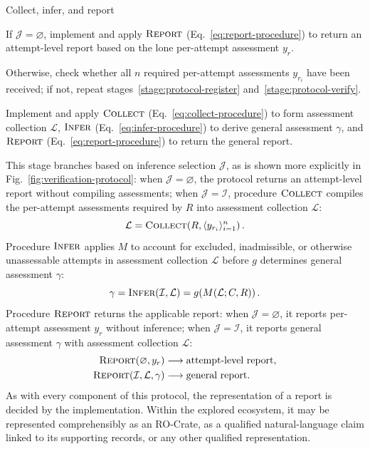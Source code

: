 \documentclass[conference,a4paper]{IEEEtran}
\begin{document}
  \begin{protocolstage}{Collect, infer, and report}
    \label{stage:protocol-report}
    \item\label{step:protocol-inference-bound}
      If $\mathcal J=\varnothing$, implement and apply $\operatorname{\textsc{Report}}$ (Eq.~\eqref{eq:report-procedure}) to return an attempt-level report based on the lone per-attempt assessment $y_r$.
    \item\label{step:protocol-attempts-collected}
      Otherwise, check whether all $n$ required per-attempt assessments $y_{r_i}$ have been received; if not, repeat stages~\ref{stage:protocol-register} and~\ref{stage:protocol-verify}.
    \item\label{step:protocol-infer-report}
      Implement and apply $\operatorname{\textsc{Collect}}$ (Eq.~\eqref{eq:collect-procedure}) to form assessment collection $\mathcal L$, $\operatorname{\textsc{Infer}}$ (Eq.~\eqref{eq:infer-procedure}) to derive general assessment $\gamma$, and $\operatorname{\textsc{Report}}$ (Eq.~\eqref{eq:report-procedure}) to return the general report.
  \end{protocolstage}
  This stage branches based on inference selection $\mathcal J$, as is shown more explicitly in Fig.~\ref{fig:verification-protocol}: when $\mathcal J=\varnothing$, the protocol returns an attempt-level report without compiling assessments; when $\mathcal J=\mathcal I$, procedure $\operatorname{\textsc{Collect}}$ compiles the per-attempt assessments required by $R$ into assessment collection $\mathcal L$:
  \begin{equation}
    \mathcal L
      =\operatorname{\textsc{Collect}}\!\left(R,\langle y_{r_i}\rangle_{i=1}^{n}\right).
    \label{eq:collect-procedure}
  \end{equation}
  Procedure $\operatorname{\textsc{Infer}}$ applies $M$ to account for excluded, inadmissible, or otherwise unassessable attempts in assessment collection $\mathcal L$ before $g$ determines general assessment $\gamma$:
  \begin{equation}
    \gamma
      =\operatorname{\textsc{Infer}}(\mathcal I,\mathcal L)
       =g\!\left(M(\mathcal L;C,R)\right).
    \label{eq:infer-procedure}
  \end{equation}
  Procedure $\operatorname{\textsc{Report}}$ returns the applicable report: when $\mathcal J=\varnothing$, it reports per-attempt assessment $y_r$ without inference; when $\mathcal J=\mathcal I$, it reports general assessment $\gamma$ with assessment collection $\mathcal L$:
  \begin{equation}
    \begin{aligned}
      \operatorname{\textsc{Report}}(\varnothing,y_r)
        &\longrightarrow \text{attempt-level report},\\
      \operatorname{\textsc{Report}}(\mathcal I,\mathcal L,\gamma)
        &\longrightarrow \text{general report}.
    \end{aligned}
    \label{eq:report-procedure}
  \end{equation}
  As with every component of this protocol, the representation of a report is decided by the implementation. Within the explored ecosystem, it may be represented comprehensibly as an RO-Crate, as a qualified natural-language claim linked to its supporting records, or any other qualified representation.
\end{document}
